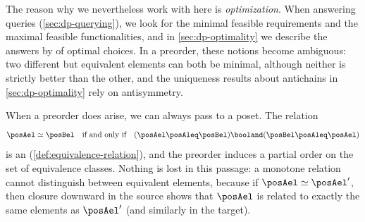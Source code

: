 The reason why we nevertheless work with  here is \emph{optimization}.
When answering queries (\cref{sec:dp-querying}), we look for the minimal feasible requirements and the maximal feasible functionalities, and in \cref{sec:dp-optimality} we describe the answers by  of optimal choices.
In a preorder, these notions become ambiguous: two different but equivalent elements can both be minimal, although neither is strictly better than the other, and the uniqueness results about antichains in \cref{sec:dp-optimality} rely on antisymmetry.

When a preorder does arise, we can always pass to a poset.
The relation
\begin{equation}
    \posAel \simeq \posBel
    \quad \text{if and only if} \quad
    (\posAel \posAleq \posBel) \booland (\posBel \posAleq \posAel)
\end{equation}
is an  (\cref{def:equivalence-relation}), and the preorder induces a partial order on the set of equivalence classes.
Nothing is lost in this passage: a monotone relation cannot distinguish between equivalent elements, because if $\posAel \simeq \posAel'$, then closure downward in the source shows that $\posAel$ is related to exactly the same elements as $\posAel'$ (and similarly in the target).

